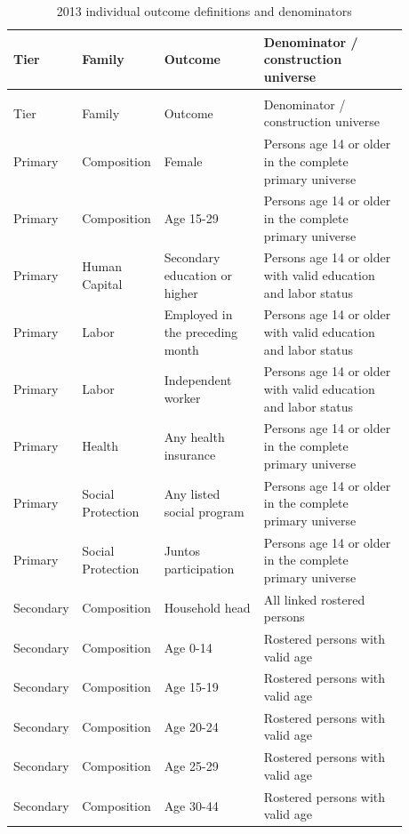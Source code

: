 \begingroup\fontsize{9.25}{11.4}\selectfont
\setlength{\tabcolsep}{3pt}\renewcommand{\arraystretch}{1.18}
\begin{longtable}{@{}>{\raggedright\arraybackslash}p{0.10\linewidth}p{0.17\linewidth}p{0.25\linewidth}p{0.36\linewidth}@{}}
\caption{2013 individual outcome definitions and denominators}\label{tab:pub_A15} \\
\toprule Tier & Family & Outcome & Denominator / construction universe \\ \midrule\endfirsthead
\multicolumn{4}{c}{\tablename\ \thetable{} -- continued} \\
\toprule Tier & Family & Outcome & Denominator / construction universe \\ \midrule\endhead
Primary & Composition & Female & Persons age 14 or older in the complete primary universe \\
Primary & Composition & Age 15-29 & Persons age 14 or older in the complete primary universe \\
Primary & Human Capital & Secondary education or higher & Persons age 14 or older with valid education and labor status \\
Primary & Labor & Employed in the preceding month & Persons age 14 or older with valid education and labor status \\
Primary & Labor & Independent worker & Persons age 14 or older with valid education and labor status \\
Primary & Health & Any health insurance & Persons age 14 or older in the complete primary universe \\
Primary & Social Protection & Any listed social program & Persons age 14 or older in the complete primary universe \\
Primary & Social Protection & Juntos participation & Persons age 14 or older in the complete primary universe \\
Secondary & Composition & Household head & All linked rostered persons \\
Secondary & Composition & Age 0-14 & Rostered persons with valid age \\
Secondary & Composition & Age 15-19 & Rostered persons with valid age \\
Secondary & Composition & Age 20-24 & Rostered persons with valid age \\
Secondary & Composition & Age 25-29 & Rostered persons with valid age \\
Secondary & Composition & Age 30-44 & Rostered persons with valid age \\

\end{longtable}
